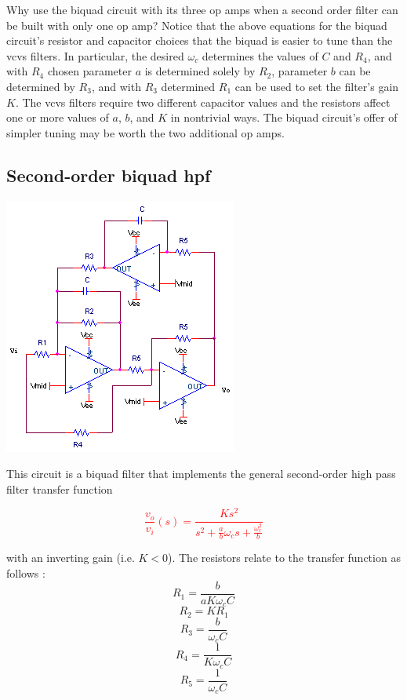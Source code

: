 Why use the biquad circuit with its three op amps when a second order filter can be built with only one op amp?
Notice that the above equations for the biquad circuit's resistor and capacitor choices that the biquad is easier to tune than the \ac{vcvs} filters.
In particular, the desired $\omega_{c}$ determines the values of $C$ and $R_4$, and with $R_4$ chosen parameter $a$ is determined solely by $R_2$, parameter $b$ can be determined by $R_3$, and with $R_3$ determined $R_1$ can be used to set the filter's gain $K$.
The \ac{vcvs} filters require two different capacitor values and the resistors affect one or more values of $a$, $b$, and $K$ in nontrivial ways.
The biquad circuit's offer of simpler tuning may be worth the two additional op amps. \autocite[120-122]{op-amp-circuits-johnson}

\subsection{Second-order biquad \acl{hpf}}
\begin{center}
	\includegraphics{schematics/2ndorderbiquadHPfilter.PNG}
\end{center}
This circuit is a biquad filter that implements the general second-order high pass filter transfer function

\textcolor{red}{
\begin{equation}
\frac{v_{o}}{v_{i}}(s) = \frac{Ks^{2}}{s^{2} + \frac{a}{b}\omega_{c}s + \frac{\omega_{c}^{2}}{b}}
\label{eq:2ndorderbiquadHPfilter}
\end{equation}
}

with an inverting gain (i.e. $K < 0$).
The resistors relate to the transfer function as follows \autocite[131]{op-amp-circuits-johnson}:
\begin{equation}
R_1 = \frac{b}{aK\omega_{c}C}
\end{equation}
\begin{equation}
R_2 = KR_1
\end{equation}
\begin{equation}
R_3 = \frac{b}{\omega_{c}C}
\end{equation}
\begin{equation}
R_4 = \frac{1}{K\omega_{c}C}
\end{equation}
\begin{equation}
R_5 = \frac{1}{\omega_{c}C}
\end{equation}


